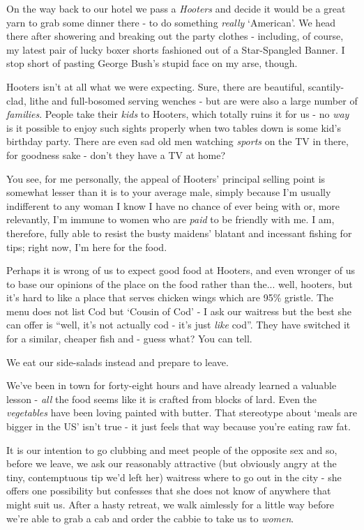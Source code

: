 \documentclass[a5paper,titlepage,11pt,draft]{book}
\begin{document}
On the way back to our hotel we pass a \emph{Hooters} and decide it would be a great yarn to grab some dinner there - to do something \emph{really} `American'.  We head there after showering and breaking out the party clothes - including, of course, my latest pair of lucky boxer shorts fashioned out of a Star-Spangled Banner.  I stop short of pasting George Bush's stupid face on my arse, though.

Hooters isn't at all what we were expecting.  Sure, there are beautiful, scantily-clad, lithe and full-bosomed serving wenches - but are were also a large number of \emph{families}.  People take their \emph{kids} to Hooters, which totally ruins it for us - no \emph{way} is it possible to enjoy such sights properly when two tables down is some kid's birthday party.  There are even sad old men watching \emph{sports} on the TV in there, for goodness sake - don't they have a TV at home?

You see, for me personally, the appeal of Hooters' principal selling point is somewhat lesser than it is to your average male, simply because I'm usually indifferent to any woman I know I have no chance of ever being with or, more relevantly, I'm immune to women who are \emph{paid} to be friendly with me.  I am, therefore, fully able to resist the busty maidens' blatant and incessant fishing for tips; right now, I'm here for the food.

Perhaps it is wrong of us to expect good food at Hooters, and even wronger of us to base our opinions of the place on the food rather than the... well, hooters, but it's hard to like a place that serves chicken wings which are 95\% gristle.  The menu does not list Cod but `Cousin of Cod' - I ask our waitress but the best she can offer is ``well, it's not actually cod - it's just \emph{like} cod''.  They have switched it for a similar, cheaper fish and - guess what?  You can tell.

We eat our side-salads instead and prepare to leave.

We've been in town for forty-eight hours and have already learned a valuable lesson - \emph{all} the food seems like it is crafted from blocks of lard.  Even the \emph{vegetables} have been loving painted with butter.  That stereotype about `meals are bigger in the US' isn't true - it just feels that way because you're eating raw fat.

It is our intention to go clubbing and meet people of the opposite sex and so, before we leave, we ask our reasonably attractive (but obviously angry at the tiny, contemptuous tip we'd left her) waitress where to go out in the city - she offers one possibility but confesses that she does not know of anywhere that might suit us.  After a hasty retreat, we walk aimlessly for a little way before we're able to grab a cab and order the cabbie to take us to \emph{women}.
\end{document}
